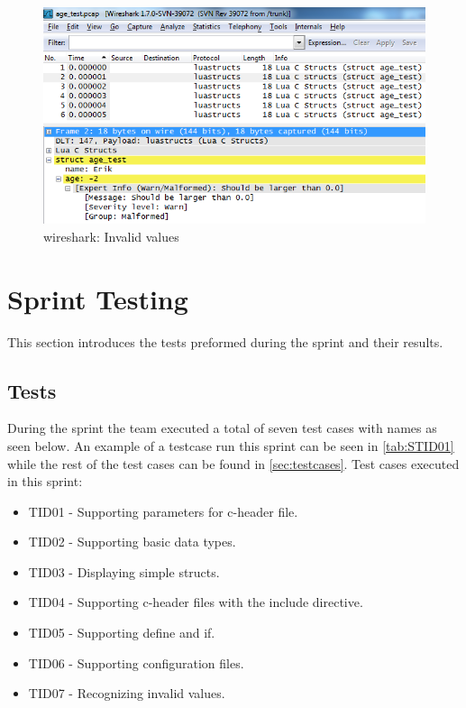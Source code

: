 \begin{figure}[htb]
	\center
	\includegraphics[width=\textwidth]{./sprints/img/wireshark_outofrange}
	\caption{\Gls{wireshark}: Invalid values\label{fig:sp1rangerule}}
\end{figure}


\section{Sprint Testing}
\label{sec:sp1:test}
This section introduces the tests preformed during the sprint and their
results.

\subsection{Tests}
During the sprint the team executed a total of seven test cases with names as seen
below. An example of a testcase run this sprint can be seen in \autoref{tab:STID01} while the rest of the test cases can be found in \autoref{sec:testcases}. 
Test cases executed in this sprint:
\begin{itemize}
	\item TID01 - Supporting parameters for \Gls{c}-\gls{header} file.
	\item TID02 - Supporting basic data types.
	\item TID03 - Displaying simple \glspl{struct}.
	\item TID04 - Supporting \Gls{c}-\gls{header} files with the \gls{include} directive.
	\item TID05 - Supporting \gls{define} and \gls{if}.
	\item TID06 - Supporting configuration files. 
	\item TID07 - Recognizing invalid values.
\end{itemize}

